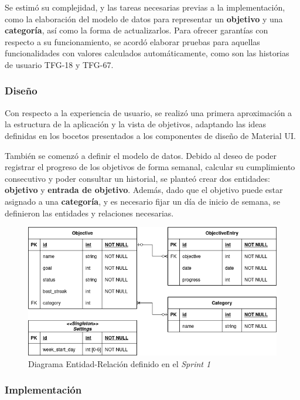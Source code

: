 \documentclass[10pt, a4paper]{aqademic}
\begin{document}
Se estimó su complejidad, y las tareas necesarias previas a la implementación, como la elaboración del modelo de datos para representar un \textbf{objetivo} y una \textbf{categoría}, así como la forma de actualizarlos. Para ofrecer garantías con respecto a su funcionamiento, se acordó elaborar pruebas para aquellas funcionalidades con valores calculados automáticamente, como son las historias de usuario TFG-18 y TFG-67.


\subsubsection{Diseño}

Con respecto a la experiencia de usuario, se realizó una primera aproximación a la estructura de la aplicación y la vista de objetivos, adaptando las ideas definidas en los bocetos presentados a los componentes de diseño de Material UI. 

También se comenzó a definir el modelo de datos. Debido al deseo de poder registrar el progreso de los objetivos de forma semanal, calcular su cumplimiento consecutivo y poder consultar un historial, se planteó crear dos entidades: \textbf{objetivo} y \textbf{entrada de objetivo}.
Además, dado que el objetivo puede estar asignado a una \textbf{categoría}, y es necesario fijar un día de inicio de semana, se definieron las entidades y relaciones necesarias.


\begin{figure}[h!]
	\centering
	\includegraphics[scale=0.6]{img/sprint1-modelo-datos.png}
	\caption{Diagrama Entidad-Relación definido en el \textit{Sprint 1}}
\end{figure}

\subsubsection{Implementación}
\end{document}
